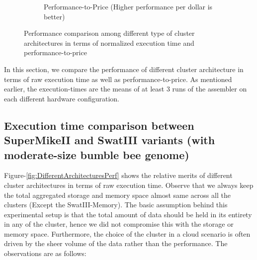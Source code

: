 \documentclass[conference]{IEEEtran}
\begin{document}
\begin{figure}[htb]
\begin{subfigure}[b]{0.5\textwidth}
                \caption{Performance-to-Price (Higher performance per dollar is better)}
                \label{fig:DifferentArchitecturesPerfPerDollar}
        \end{subfigure}
        \caption{Performance comparison among different type of cluster architectures in terms of normalized execution time and performance-to-price}
  \label{fig:DifferentArchitectures}
  \vspace{-1.5em}
\end{figure}
In this section, we compare the performance of different cluster architecture in terms of raw execution time as well as performance-to-price. As mentioned earlier, the execution-times are the means of at least 3 runs of the assembler on each different hardware configuration.

\subsection {Execution time comparison between SuperMikeII and SwatIII variants (with moderate-size bumble bee genome)} \label{ExecutionTimeDiffArchBumblebee}
Figure-\ref{fig:DifferentArchitecturesPerf} shows the relative merits of different cluster architectures in terms of raw execution time. Observe that we always keep the total aggregated storage and memory space almost same across all the clusters (Except the SwatIII-Memory). The basic assumption behind this experimental setup is that the total amount of data should be held in its entirety in any of the cluster, hence we did not compromise this with the storage or memory space. Furthermore, the choice of the cluster in a cloud scenario is often driven by the sheer volume of the data rather than the performance. The observations are as follows:
\end{document}

